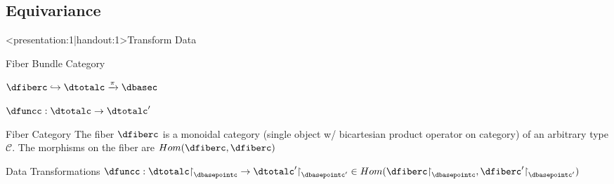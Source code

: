 \documentclass[xcolor={dvipsnames}, handout]{beamer}
\renewcommand{\restriction}{\mathord{\upharpoonright}} %
\begin{document}
\subsection{Equivariance}
\begin{frame}<presentation:1|handout:1>{Transform Data}
    \begin{block}{Fiber Bundle Category}
        \begin{description}[style=newline]
            \item[object] $\dfiberc \hookrightarrow \dtotalc \xrightarrow{\pi} \dbasec$
            \item[morphisms] $\dfuncc: \dtotalc \rightarrow \dtotalc^{\prime}$
        \end{description}
    \end{block}
    \begin{block}{Fiber Category}
        The fiber $\dfiberc$ is a  monoidal category (single object w/ bicartesian product operator on category) of an arbitrary type $\mathcal{C}$. The morphisms on the fiber are $Hom(\dfiberc, \dfiberc)$
    \end{block}

    \begin{block}{Data Transformations}
    $\dfuncc:\dtotalc\restriction_{\dbasepointc} \rightarrow \dtotalc^{\prime}\restriction_{\dbasepointc^{\prime}} \in Hom(\dfiberc\restriction_{\dbasepointc},\dfiberc^{\prime}\restriction_{\dbasepointc^{\prime}})$ 
    \end{block} 
\end{frame}
\end{document}
